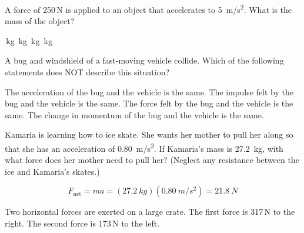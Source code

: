 \documentclass[]{exam}
\begin{document}
\begin{questions}
\question 
A force of 250\,N is applied to an object that accelerates to \SI{5}{m/s^2}. What is the mass of the object?

\begin{randomizechoices}
    \,kg 
    \,kg
    \,kg
    \,kg
\end{randomizechoices}

\question %
A bug and windshield of a fast-moving vehicle collide. Which of the following statements does NOT describe this situation?

\begin{randomizechoices}
    \correctchoice The acceleration of the bug and the vehicle is the same.
    \choice The impulse felt by the bug and the vehicle is the same.
    \choice The force felt by the bug and the vehicle is the same.
    \choice The change in momentum of the bug and the vehicle is the same.
\end{randomizechoices}

\question
Kamaria is learning how to ice skate. She wants her mother to pull her along so that she has an acceleration of \SI{0.80}{m/s^2}. If Kamaria's mass is \SI{27.2}{kg}, with what force does her mother need to pull her? (Neglect any resistance between the ice and Kamaria’s skates.)

\begin{solution}
\phantom{.}

\begin{equation*}
    F_\mathrm{net} = m a = (\SI{27.2}{kg})(\SI{0.80}{m/s^2}) = \boxed{\SI{21.8}{N}}
\end{equation*}
\end{solution}

\question
Two horizontal forces are exerted on a large crate. The first force is 317\,N to the right. The second force is 173\,N to the left. 

\end{questions}
\end{document}
